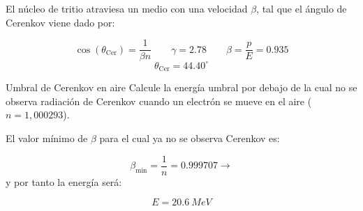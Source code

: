 El núcleo de tritio atraviesa un medio con una velocidad $\beta$, tal que el ángulo de Cerenkov viene dado por: 

\begin{equation}
    \cos (\theta_{\text{Cer}}) = \frac{1}{\beta n} \qquad \gamma = 2.78 \qquad \beta = \frac{p}{E} = 0.935
\end{equation}
\begin{equation}
    \theta_{\text{Cer}} = 44.40^{\circ}
\end{equation}



\begin{Ejercicio}{Umbral de Cerenkov en aire}\label{Ej:11}
Calcule la energía umbral por debajo de la cual no se observa radiación de Cerenkov cuando un electrón se mueve en el aire ($n=1{,}000293$).
\end{Ejercicio}

El valor mínimo de $\beta$ para el cual ya no se observa Cerenkov es: 

\begin{equation}
    \beta_{\min} = \frac{1}{n}  = 0.999707 \to 
\end{equation}
y por tanto la energía será: 

\begin{equation}
    E = 20.6 \ \unit{MeV}
\end{equation}

